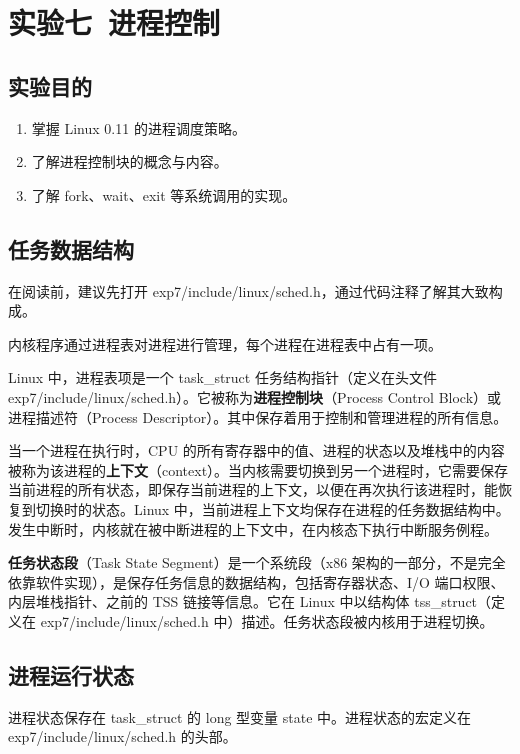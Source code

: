 \section{实验七\ 进程控制}

\subsection{实验目的}

\begin{enumerate}
    \item 掌握 Linux 0.11 的进程调度策略。
    \item 了解进程控制块的概念与内容。
    \item 了解 fork、wait、exit 等系统调用的实现。
\end{enumerate}

\subsection{任务数据结构}

在阅读前，建议先打开 exp7/include/linux/sched.h，通过代码注释了解其大致构成。

内核程序通过进程表对进程进行管理，每个进程在进程表中占有一项。

Linux 中，进程表项是一个 task\_struct 任务结构指针（定义在头文件 exp7/include/linux/sched.h）。它被称为\textbf{进程控制块}（Process Control Block）或进程描述符（Process Descriptor）。其中保存着用于控制和管理进程的所有信息。

当一个进程在执行时，CPU 的所有寄存器中的值、进程的状态以及堆栈中的内容被称为该进程的\textbf{上下文}（context）。当内核需要切换到另一个进程时，它需要保存当前进程的所有状态，即保存当前进程的上下文，以便在再次执行该进程时，能恢复到切换时的状态。Linux 中，当前进程上下文均保存在进程的任务数据结构中。发生中断时，内核就在被中断进程的上下文中，在内核态下执行中断服务例程。

\textbf{任务状态段}（Task State Segment）是一个系统段（x86 架构的一部分，不是完全依靠软件实现），是保存任务信息的数据结构，包括寄存器状态、I/O 端口权限、内层堆栈指针、之前的 TSS 链接等信息。它在 Linux 中以结构体 tss\_struct（定义在 exp7/include/linux/sched.h 中）描述。任务状态段被内核用于进程切换。

\subsection{进程运行状态}

进程状态保存在 task\_struct 的 long 型变量 state 中。进程状态的宏定义在 exp7/include/linux/sched.h 的头部。

